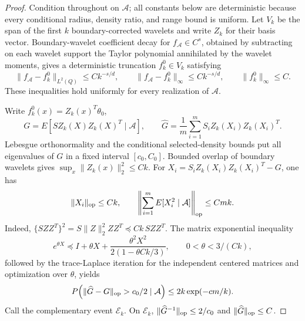 \documentclass{article}
\begin{document}
\begin{proof}
Condition throughout on \(\mathcal A\); all constants below are deterministic because every conditional radius, density ratio, and range bound is uniform.  Let \(V_k\) be the span of the first \(k\) boundary-corrected wavelets and write \(Z_k\) for their basis vector.  Boundary-wavelet coefficient decay for \(f_{\mathcal A}\in C^s\), obtained by subtracting on each wavelet support the Taylor polynomial annihilated by the wavelet moments, gives a deterministic truncation \(f_k^0\in V_k\) satisfying
\[
\|f_{\mathcal A}-f_k^0\|_{L^2(Q)}\le Ck^{-s/d},\qquad
\|f_{\mathcal A}-f_k^0\|_\infty\le Ck^{-s/d},\qquad
\|f_k^0\|_\infty\le C.
\]
These inequalities hold uniformly for every realization of \(\mathcal A\).

Write \(f_k^0(x)=Z_k(x)^T\theta_0\),
\[
G=E[SZ_k(X)Z_k(X)^T\mid\mathcal A],\qquad
\widehat G=\frac1m\sum_{i=1}^mS_iZ_k(X_i)Z_k(X_i)^T .
\]
Lebesgue orthonormality and the conditional selected-density bounds put all eigenvalues of \(G\) in a fixed interval \([c_0,C_0]\).  Bounded overlap of boundary wavelets gives
\(\sup_x\|Z_k(x)\|_2^2\le Ck\).  For
\(X_i=S_iZ_k(X_i)Z_k(X_i)^T-G\), one has
\[
\|X_i\|_{\rm op}\le Ck,\qquad
\left\|\sum_{i=1}^mE[X_i^2\mid\mathcal A]\right\|_{\rm op}\le Cmk.
\]
Indeed, \(\{SZZ^T\}^2=S\|Z\|_2^2ZZ^T\preceq Ck\,SZZ^T\).  The matrix exponential inequality
\[
e^{\theta X}\preceq I+\theta X+
\frac{\theta^2X^2}{2(1-\theta Ck/3)},\qquad 0<\theta<3/(Ck),
\]
followed by the trace-Laplace iteration for the independent centered matrices and optimization over \(\theta\), yields
\[
P\!\left(\|\widehat G-G\|_{\rm op}>c_0/2\mid\mathcal A\right)
\le 2k\exp(-cm/k).
\]
Call the complementary event \(\mathcal E_k\).  On \(\mathcal E_k\),
\(\|\widehat G^{-1}\|_{\rm op}\le2/c_0\) and
\(\|\widehat G\|_{\rm op}\le C\).


\end{proof}
\end{document}

